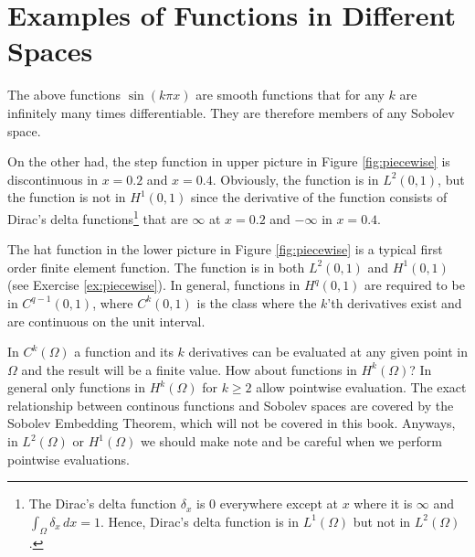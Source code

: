\section{Examples of Functions in Different Spaces}

The above functions $\sin(k \pi x)$ are smooth functions
that for any $k$ are infinitely many times differentiable. 
They are therefore members of any Sobolev space. 

On the other had, the step function in upper picture in Figure \ref{fig:piecewise} is 
discontinuous in $x=0.2$ and $x=0.4$. Obviously, the function is in $L^2(0,1)$, but 
the function is not in $H^1(0,1)$ since the derivative of the function  consists of Dirac's 
delta functions\footnote{The Dirac's delta function $\delta_x$ is 0 everywhere except at 
$x$ where it is  $\infty$ and $\int_\Omega \delta_x \, dx = 1$. Hence, 
Dirac's delta function is in $L^1(\Omega)$ but not in $L^2(\Omega)$.  
} 
that are $\infty$ at $x=0.2$ and 
$-\infty$ in $x=0.4$. 

The hat function in the lower picture in Figure \ref{fig:piecewise} is a typical
first order finite element function. The function is in both $L^2(0,1)$ and $H^1(0,1)$ (see
Exercise \ref{ex:piecewise}).         
In general, functions in $H^q(0,1)$ are required to be in $C^{q-1}(0,1)$, where $C^k(0,1)$ is the
class  where the $k$'th derivatives exist and
are continuous on the unit interval.   

\begin{remark}
In $C^k(\Omega)$ a function and its $k$ derivatives can be evaluated at any given point in $\Omega$ and  
the result will be a finite value. How about functions in $H^k(\Omega)$? In general only functions
in $H^k(\Omega)$ for $k\ge 2$ allow pointwise evaluation. The exact relationship between 
continous functions and Sobolev spaces are covered by the  Sobolev Embedding Theorem, which will not 
be covered in this book. 
Anyways, in $L^2(\Omega)$ or $H^1(\Omega)$ we should make note and be careful when we perform pointwise evaluations. 
\end{remark}


